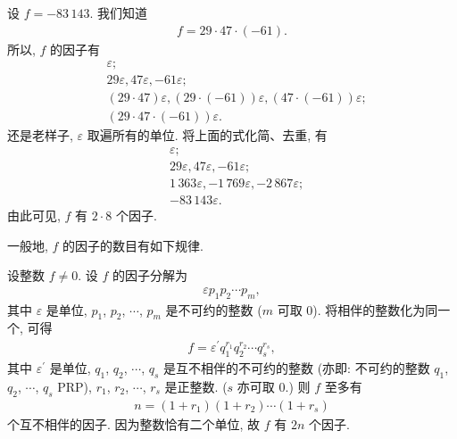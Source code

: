 \begin{example}
    设 $f = -83\,143$. 我们知道
    \begin{align*}
        f = 29 \cdot 47 \cdot (-61).
    \end{align*}
    所以, $f$ 的因子有
    \begin{align*}
         & \varepsilon;                                                                        \\
         & 29\varepsilon, 47\varepsilon, -61\varepsilon;                                       \\
         & (29 \cdot 47)\varepsilon, (29 \cdot (-61))\varepsilon, (47 \cdot (-61))\varepsilon; \\
         & (29 \cdot 47 \cdot (-61))\varepsilon.
    \end{align*}
    还是老样子, $\varepsilon$ 取遍所有的单位. 将上面的式化简、去重, 有
    \begin{align*}
         & \varepsilon;                                               \\
         & 29\varepsilon, 47\varepsilon, -61\varepsilon;              \\
         & 1\,363\varepsilon, -1\,769\varepsilon, -2\,867\varepsilon; \\
         & -83\,143\varepsilon.
    \end{align*}
    由此可见, $f$ 有 $2 \cdot 8$ 个因子.
\end{example}

一般地, $f$ 的因子的数目有如下规律.

\begin{proposition}
    设整数 $f \neq 0$. 设 $f$ 的因子分解为
    \begin{align*}
        \varepsilon p_1 p_2 \cdots p_m,
    \end{align*}
    其中 $\varepsilon$ 是单位, $p_1$, $p_2$, $\cdots$, $p_m$ 是不可约的整数 ($m$ 可取 $0$). 将相伴的整数化为同一个, 可得
    \begin{align*}
        f = \varepsilon^{\prime} q_1^{r_1} q_2^{r_2} \cdots q_s^{r_s},
    \end{align*}
    其中 $\varepsilon^{\prime}$ 是单位, $q_1$, $q_2$, $\cdots$, $q_s$ 是互不相伴的不可约的整数 (亦即: 不可约的整数 $q_1$, $q_2$, $\cdots$, $q_s$ PRP), $r_1$, $r_2$, $\cdots$, $r_s$ 是正整数. ($s$ 亦可取 $0$.) 则 $f$ 至多有
    \begin{align*}
        n = (1 + r_1) (1 + r_2) \cdots (1 + r_s)
    \end{align*}
    个互不相伴的因子. 因为整数恰有二个单位, 故 $f$ 有 $2n$ 个因子.
\end{proposition}


